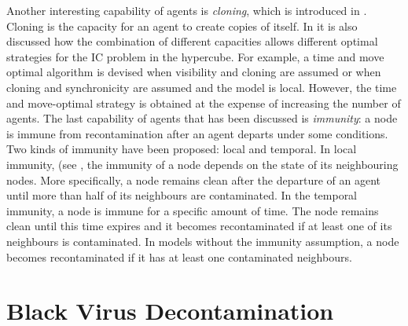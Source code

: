 Another interesting capability of agents is {\em cloning}, which is introduced in \cite{mhuang1}. Cloning is the capacity for an agent to create copies of itself. In \cite{mhuang1} it is also discussed how the combination of different capacities allows different optimal strategies for the IC problem in the hypercube. For example, a  time and move optimal algorithm is devised  when visibility and cloning are assumed or when cloning and synchronicity are assumed and the model is  local. However, the time and move-optimal strategy is obtained at the expense of increasing the number of agents.
The last capability of agents that has been discussed is {\em immunity}:  a node is immune from recontamination after an agent departs under some conditions. Two kinds of immunity have been proposed: local and temporal. In local immunity, (see \cite{flocchini6,santoro}, the immunity of a node depends on the state of its neighbouring nodes. More specifically, a node remains clean after the departure of an agent until more than half of its neighbours are contaminated. In the temporal immunity, a node is immune for a specific amount of time. The node remains clean until this time expires and it becomes recontaminated if at least one of its neighbours is contaminated. In models without the immunity assumption, a node becomes recontaminated if it has at least one contaminated neighbours.

\section{Black Virus Decontamination}
